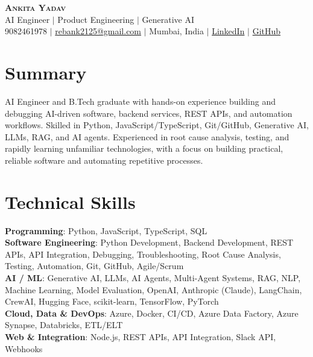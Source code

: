\documentclass[letterpaper,10.5pt]{article}
\begin{document}
\begin{center}
    \textbf{\Huge \scshape Ankita Yadav} \\ \vspace{3pt}
    \small AI Engineer $|$ Product Engineering $|$ Generative AI \\ \vspace{2pt}
    \small 9082461978 $|$ \href{mailto:rebank2125@gmail.com}{rebank2125@gmail.com} $|$ Mumbai, India $|$
    \href{https://www.linkedin.com/in/ankita-yadav-913923203}{LinkedIn} $|$ \href{https://github.com/rebeluni}{GitHub}
\end{center}

\section{Summary}
\small{AI Engineer and B.Tech graduate with hands-on experience building and debugging AI-driven software, backend services, REST APIs, and automation workflows. Skilled in Python, JavaScript/TypeScript, Git/GitHub, Generative AI, LLMs, RAG, and AI agents. Experienced in root cause analysis, testing, and rapidly learning unfamiliar technologies, with a focus on building practical, reliable software and automating repetitive processes.}

\section{Technical Skills}
\begin{itemize}[leftmargin=0.15in, label={}]
    \small{\item{
     \textbf{Programming}{: Python, JavaScript, TypeScript, SQL} \\
     \textbf{Software Engineering}{: Python Development, Backend Development, REST APIs, API Integration, Debugging, Troubleshooting, Root Cause Analysis, Testing, Automation, Git, GitHub, Agile/Scrum} \\
     \textbf{AI / ML}{: Generative AI, LLMs, AI Agents, Multi-Agent Systems, RAG, NLP, Machine Learning, Model Evaluation, OpenAI, Anthropic (Claude), LangChain, CrewAI, Hugging Face, scikit-learn, TensorFlow, PyTorch} \\
     \textbf{Cloud, Data \& DevOps}{: Azure, Docker, CI/CD, Azure Data Factory, Azure Synapse, Databricks, ETL/ELT} \\
     \textbf{Web \& Integration}{: Node.js, REST APIs, API Integration, Slack API, Webhooks}
    }}
\end{itemize}
\end{document}
